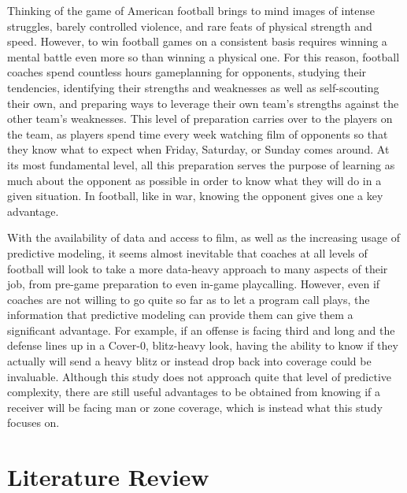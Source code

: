 \documentclass{article}
\begin{document}
Thinking of the game of American football brings to mind images of intense struggles, barely controlled violence, and rare feats of physical strength and speed. However, to win football games on a consistent basis requires winning a mental battle even more so than winning a physical one. For this reason, football coaches spend countless hours gameplanning for opponents, studying their tendencies, identifying their strengths and weaknesses as well as self-scouting their own, and preparing ways to leverage their own team's strengths against the other team's weaknesses. This level of preparation carries over to the players on the team, as players spend time every week watching film of opponents so that they know what to expect when Friday, Saturday, or Sunday comes around. At its most fundamental level, all this preparation serves the purpose of learning as much about the opponent as possible in order to know what they will do in a given situation. In football, like in war, knowing the opponent gives one a key advantage. 

With the availability of data and access to film, as well as the increasing usage of predictive modeling, it seems almost inevitable that coaches at all levels of football will look to take a more data-heavy approach to many aspects of their job, from pre-game preparation to even in-game playcalling. However, even if coaches are not willing to go quite so far as to let a program call plays, the information that predictive modeling can provide them can give them a significant advantage. For example, if an offense is facing third and long and the defense lines up in a Cover-0, blitz-heavy look, having the ability to know if they actually will send a heavy blitz or instead drop back into coverage could be invaluable. Although this study does not approach quite that level of predictive complexity, there are still useful advantages to be obtained from knowing if a receiver will be facing man or zone coverage, which is instead what this study focuses on. 








\section{Literature Review}
\end{document}
